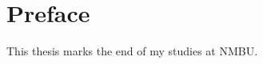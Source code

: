 \documentclass[class=book, crop=false, 11pt]{standalone}
\begin{document}
\chapter{Preface}
This thesis marks the end of my studies at NMBU.
\end{document}
